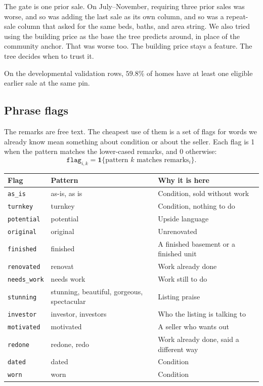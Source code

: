 \documentclass[11pt]{article}
\begin{document}
The gate is one prior sale. On July--November, requiring three prior sales was worse, and so was adding the last sale as its own column, and so was a repeat-sale column that asked for the same beds, baths, and area string. We also tried using the building price as the base the tree predicts around, in place of the community anchor. That was worse too. The building price stays a feature. The tree decides when to trust it.

On the developmental validation rows, \(59.8\%\) of homes have at least one eligible earlier sale at the same pin.

\subsection{Phrase flags}

The remarks are free text. The cheapest use of them is a set of flags for words we already know mean something about condition or about the seller. Each flag is 1 when the pattern matches the lower-cased remarks, and 0 otherwise:
\[
\texttt{flag}_{i,k} = \mathbf{1}\{\text{pattern } k \text{ matches remarks}_i\}.
\]

\begin{center}
\small
\begin{tabular}{llp{7.2cm}}
\toprule
Flag & Pattern & Why it is here \\
\midrule
\texttt{as\_is} & as-is, as is & Condition, sold without work \\
\texttt{turnkey} & turnkey & Condition, nothing to do \\
\texttt{potential} & potential & Upside language \\
\texttt{original} & original & Unrenovated \\
\texttt{finished} & finished & A finished basement or a finished unit \\
\texttt{renovated} & renovat & Work already done \\
\texttt{needs\_work} & needs work & Work still to do \\
\texttt{stunning} & stunning, beautiful, gorgeous, spectacular & Listing praise \\
\texttt{investor} & investor, investors & Who the listing is talking to \\
\texttt{motivated} & motivated & A seller who wants out \\
\texttt{redone} & redone, redo & Work already done, said a different way \\
\texttt{dated} & dated & Condition \\
\texttt{worn} & worn & Condition \\
\bottomrule
\end{tabular}
\end{center}
\end{document}
